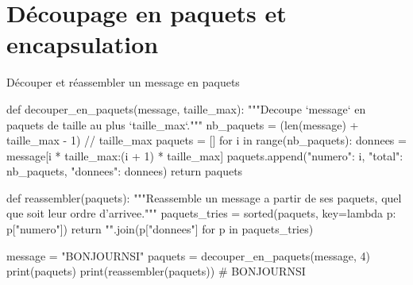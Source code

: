 \section{Découpage en paquets et encapsulation}




\begin{codereference}{Découper et réassembler un message en paquets}
\begin{python}
def decouper_en_paquets(message, taille_max):
    """Decoupe `message` en paquets de taille au plus `taille_max`."""
    nb_paquets = (len(message) + taille_max - 1) // taille_max
    paquets = []
    for i in range(nb_paquets):
        donnees = message[i * taille_max:(i + 1) * taille_max]
        paquets.append({"numero": i, "total": nb_paquets, "donnees": donnees})
    return paquets

def reassembler(paquets):
    """Reassemble un message a partir de ses paquets, quel que soit leur ordre d'arrivee."""
    paquets_tries = sorted(paquets, key=lambda p: p["numero"])
    return "".join(p["donnees"] for p in paquets_tries)

message = "BONJOURNSI"
paquets = decouper_en_paquets(message, 4)
print(paquets)
print(reassembler(paquets))  # BONJOURNSI
\end{python}
\end{codereference}


